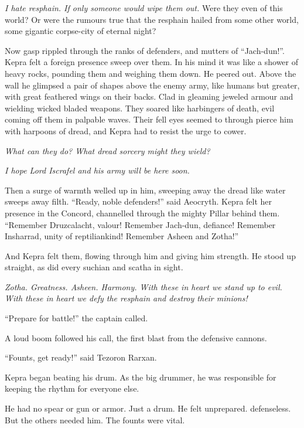 \documentclass
  [a4paper,
   12pt,
   oneside
  ]%
  {article}
\begin{document}
\emph{I hate resphain. If only someone would wipe them out.} Were they even of this world? Or were the rumours true that the resphain hailed from some other world, some gigantic corpse-city of eternal night?

Now gasp rippled through the ranks of defenders, and mutters of ``Jach-dun!''. 
Kepra felt a foreign presence sweep over them.
In his mind it was like a shower of heavy rocks, pounding them and weighing them down. 
He peered out. Above the wall he glimpsed a pair of shapes above the enemy army, like humans but greater, with great feathered wings on their backs. Clad in gleaming jeweled armour and wielding wicked bladed weapons. 
They soared like harbingers of death, evil coming off them in palpable waves. 
Their fell eyes seemed to through pierce him with harpoons of dread, and Kepra had to resist the urge to cower. 

\emph{What can they do? What dread sorcery might they wield?} 

\emph{I hope Lord Iscrafel and his army will be here soon.}

Then a surge of warmth welled up in him, sweeping away the dread like water sweeps away filth. 
``Ready, noble defenders!'' said Aeocryth. Kepra felt her presence in the Concord, channelled through the mighty Pillar behind them. ``Remember Druzcalacht, valour! Remember Jach-dun, defiance! Remember Insharrad, unity of reptiliankind! Remember Asheen and Zotha!'' 

And Kepra felt them, flowing through him and giving him strength. He stood up straight, as did every suchian and scatha in sight. 

\emph{Zotha. Greatness. Asheen. Harmony. With these in heart we stand up to evil. With these in heart we defy the resphain and destroy their minions!}

``Prepare for battle!'' the captain called.

A loud boom followed his call, the first blast from the defensive cannons. 

``Founts, get ready!'' said Tezoron Rarxan. 

Kepra began beating his drum. As the big drummer, he was responsible for keeping the rhythm for everyone else.

He had no spear or gun or armor. Just a drum. He felt unprepared. defenseless. 
But the others needed him. The founts were vital. 
\end{document}
